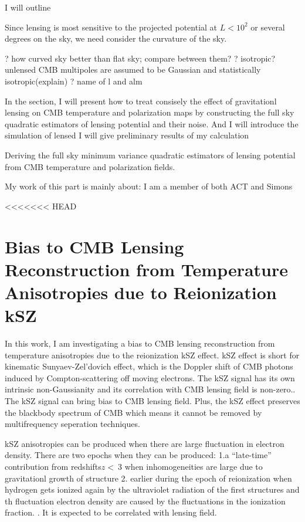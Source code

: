 \documentclass[12pt, notitlepage, onecolumn, amsmath, amssymb, aps]{revtex4-1}
\begin{document}
I will outline 

Since lensing is most sensitive to the projected potential at \(L<10^2\) or several degrees on the sky, we need consider the curvature of the sky. 


? how curved sky better than flat sky; compare between them? 
? isotropic? unlensed CMB multipoles are assumed to be Gaussian and statistically isotropic(explain)
? name of l and alm

In the section, I will present how to treat consisely the effect of gravitationl lensing on CMB temperature and polarization maps by constructing the full sky quadratic estimators of lensing potential and their noise. And I will introduce the simulation of lensed I will give preliminary results of my calculation 

Deriving the full sky minimum variance quadratic estimators of lensing potential from CMB temperature and polarization fields.

My work of this part is mainly about:
I am a member of both ACT and Simons

<<<<<<< HEAD
\section{Bias to CMB Lensing Reconstruction from Temperature Anisotropies due to Reionization kSZ}
\label{sec:org093d799}

In this work, I am investigating a bias to CMB lensing reconstruction from temperature anisotropies due to the reionization kSZ effect. kSZ effect is short for kinematic Sunyaev-Zel'dovich effect, which is the Doppler shift of CMB photons induced by Compton-scattering off moving electrons.\cite{Ferraro:2017fac}
The kSZ signal has its own intrinsic non-Gaussianity and its correlation with CMB lensing field is non-zero.\cite{Smith:2016lnt}. The kSZ signal can bring bias to CMB lensing field. Plus, the kSZ effect preserves the blackbody spectrum of CMB which means it cannot be removed by multifrequency seperation techniques.\cite{Smith:2009pn}


kSZ anisotropies can be produced when there are large fluctuation in electron density. There are two epochs when they can be produced: 1.a ``late-time'' contribution from redshifts\(z<~3\) when inhomogeneities are large due to gravitationl growth of structure 2. earlier during the epoch of reionization when hydrogen gets ionized again by the ultraviolet radiation of the first structures and th fluctuation electron density are caused by the fluctuations in the ionization fraction.\cite{Ferraro:2017fac} \cite{Alvarez:2015xzu}. It is expected to be correlated with lensing field.\cite{Ferraro:2017fac}
\end{document}
